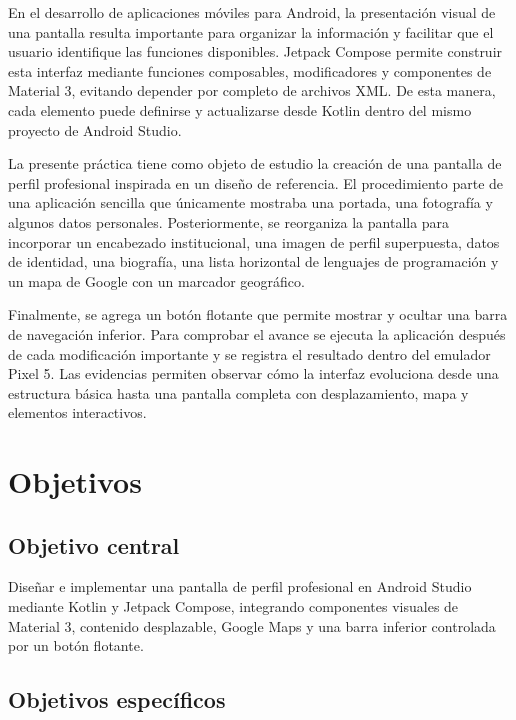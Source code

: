 \documentclass[12pt,a4paper]{article}
\begin{document}
En el desarrollo de aplicaciones móviles para Android, la presentación visual de una pantalla resulta importante para organizar la información y facilitar que el usuario identifique las funciones disponibles. Jetpack Compose permite construir esta interfaz mediante funciones composables, modificadores y componentes de Material 3, evitando depender por completo de archivos XML. De esta manera, cada elemento puede definirse y actualizarse desde Kotlin dentro del mismo proyecto de Android Studio.

La presente práctica tiene como objeto de estudio la creación de una pantalla de perfil profesional inspirada en un diseño de referencia. El procedimiento parte de una aplicación sencilla que únicamente mostraba una portada, una fotografía y algunos datos personales. Posteriormente, se reorganiza la pantalla para incorporar un encabezado institucional, una imagen de perfil superpuesta, datos de identidad, una biografía, una lista horizontal de lenguajes de programación y un mapa de Google con un marcador geográfico.

Finalmente, se agrega un botón flotante que permite mostrar y ocultar una barra de navegación inferior. Para comprobar el avance se ejecuta la aplicación después de cada modificación importante y se registra el resultado dentro del emulador Pixel 5. Las evidencias permiten observar cómo la interfaz evoluciona desde una estructura básica hasta una pantalla completa con desplazamiento, mapa y elementos interactivos.

\section{Objetivos}

\subsection{Objetivo central}

Diseñar e implementar una pantalla de perfil profesional en Android Studio mediante Kotlin y Jetpack Compose, integrando componentes visuales de Material 3, contenido desplazable, Google Maps y una barra inferior controlada por un botón flotante.

\subsection{Objetivos específicos}
\end{document}
